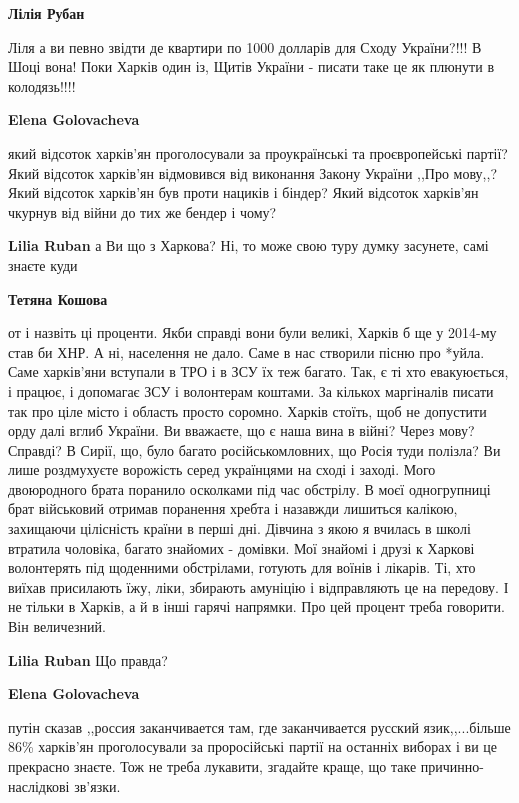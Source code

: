 \begin{itemize}
\begin{itemize}
\textbf{Лілія Рубан} 

Ліля а ви певно звідти де квартири по 1000 долларів для Сходу України?!!! В
Шоці вона! Поки Харків один із, Щитів України - писати таке це як плюнути в
колодязь!!!!

\textbf{Elena Golovacheva} 

який відсоток харків'ян проголосували за проукраїнські та проєвропейські
партії? Який відсоток харків'ян відмовився від виконання Закону України ,,Про
мову,,? Який відсоток харків'ян був проти нациків і біндер? Який відсоток
харків'ян чкурнув від війни до тих же бендер і чому?

\textbf{Lilia Ruban} а Ви що з Харкова? Ні, то може свою туру думку засунете, самі знаєте куди

\textbf{Тетяна Кошова} 

от і назвіть ці проценти. Якби справді вони були великі, Харків б ще у 2014-му
став би ХНР. А ні, населення не дало. Саме в нас створили пісню про *уйла. Саме
харків'яни вступали в ТРО і в ЗСУ їх теж багато. Так, є ті хто евакуюється, і
працює, і допомагає ЗСУ і волонтерам коштами. За кількох маргіналів писати так
про ціле місто і область просто соромно. Харків стоїть, щоб не допустити орду
далі вглиб України. Ви вважаєте, що є наша вина в війні? Через мову? Справді? В
Сирії, що, було багато російськомловних, що Росія туди полізла? Ви лише
роздмухуєте ворожість серед українцями на сході і заході. Мого двоюродного
брата поранило осколками під час обстрілу. В моєї одногрупниці брат військовий
отримав поранення хребта і назавжди лишиться калікою, захищаючи цілісність
країни в перші дні. Дівчина з якою я вчилась в школі втратила чоловіка, багато
знайомих - домівки. Мої знайомі і друзі к Харкові волонтерять під щоденними
обстрілами, готують для воїнів і лікарів. Ті, хто виїхав присилають їжу, ліки,
збирають амуніцію і відправляють це на передову. І не тільки в Харків, а й в
інші гарячі напрямки. Про цей процент треба говорити. Він величезний.

\textbf{Lilia Ruban} Що правда?

\textbf{Elena Golovacheva} 

путін сказав ,,россия заканчивается там, где заканчивается русский
язик,,...більше 86\% харків'ян проголосували за проросійські партії на останніх
виборах і ви це прекрасно знаєте. Тож не треба лукавити, згадайте краще, що
таке причинно-наслідкові зв'язки.

\end{itemize} %


\end{itemize} %
